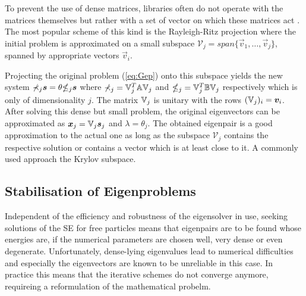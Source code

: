 To prevent the use of dense matrices, libraries often do not operate with the matrices themselves but rather with a set of vector on which these matrices act \cite{slepcManual}.
The most popular scheme of this kind is the Rayleigh-Ritz projection where the initial problem is approximated on a small subspace $\mathcal{V}_j=span \{\vec{v}_1,\hdots,\vec{v}_j\}$, spanned by appropriate vectors $\vec{v}_i$.

Projecting the original problem (\ref{eq:Gep}) onto this subspace yields the new system $\mathbb{\Sigma}_j \bm{s}=\theta\mathbb{\Theta}_j\bm{s}$ where $\mathbb{\Sigma}_j=\mathbb{V}_j^T\mathbb{A}\mathbb{V}_j$ and $\mathbb{\Theta}_j=\mathbb{V}_j^T\mathbb{B}\mathbb{V}_j$ respectively which is only of dimensionality $j$.
The matrix $\mathbb{V}_j$ is unitary with the rows $(\mathbb{V}_j)_i=\bm{v}_i$.
After solving this dense but small problem, the original eigenvectors can be approximated as $\bm{x}_j=\mathbb{V}_j\bm{s}_j$ and $\lambda=\theta_j$.
The obtained eigenpair is a good approximation to the actual one as long as the subspace $\mathcal{V}_j$ contains the respective solution or contains a vector which is at least close to it.
A commonly used approach the Krylov subspace.

\subsection{Stabilisation of Eigenproblems}
\label{ch:regular}
Independent of the efficiency and robustness of the eigensolver in use, seeking solutions of the SE for free particles means that eigenpairs are to be found whose energies are, if the numerical parameters are chosen well, very dense or even degenerate.
Unfortunately, dense-lying eigenvalues lead to numerical difficulties and especially the eigenvectors are known to be unreliable in this case.
In practice this means that the iterative schemes do not converge anymore, requireing a reformulation of the mathematical probelm.

